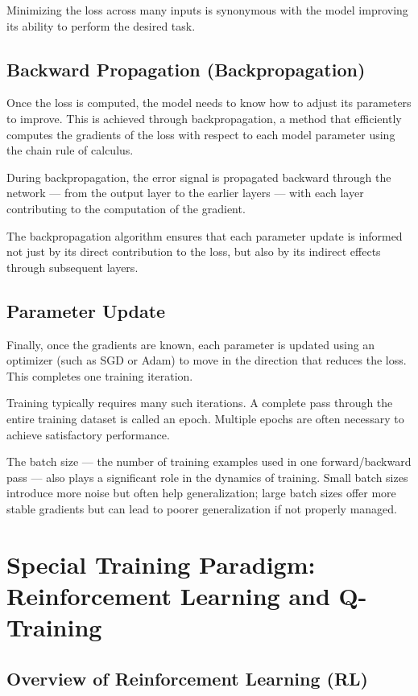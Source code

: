 \documentclass[openany]{book}
\begin{document}
Minimizing the loss across many inputs is synonymous with the model improving 
its ability to perform the desired task.

\subsection{Backward Propagation (Backpropagation)}

Once the loss is computed, the model needs to know how to adjust its parameters 
to improve. This is achieved through backpropagation, a method that efficiently 
computes the gradients of the loss with respect to each model parameter using 
the chain rule of calculus.

During backpropagation, the error signal is propagated backward through the 
network — from the output layer to the earlier layers — with each layer 
contributing to the computation of the gradient.

The backpropagation algorithm ensures that each parameter update is informed not 
just by its direct contribution to the loss, but also by its indirect effects 
through subsequent layers.

\subsection{Parameter Update}

Finally, once the gradients are known, each parameter is updated using an 
optimizer (such as SGD or Adam) to move in the direction that reduces the loss.
This completes one training iteration.

Training typically requires many such iterations. A complete pass through the 
entire training dataset is called an epoch. Multiple epochs are often necessary 
to achieve satisfactory performance.

The batch size — the number of training examples used in one forward/backward 
pass — also plays a significant role in the dynamics of training. Small batch 
sizes introduce more noise but often help generalization; large batch sizes 
offer more stable gradients but can lead to poorer generalization if not 
properly managed.

\section{Special Training Paradigm: Reinforcement Learning and Q-Training}

\subsection{Overview of Reinforcement Learning (RL)}
\end{document}
